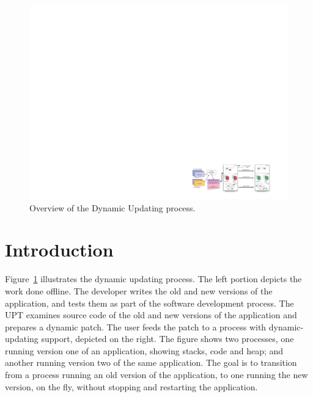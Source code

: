 \begin{figure}[t]
\centering\includegraphics[scale=0.38,clip=true,trim=2170 90 250 2125]{100-images/PASS-HPC-poster-8-2009-cropped}
\caption{Overview of the Dynamic Updating process.\label{fig:overview}}
\end{figure}

\section{Introduction}
\label{sec:system-intro}

Figure~\ref{fig:overview} illustrates the dynamic updating process. The left
portion depicts the work done offline. The developer writes the old and new
versions of the application, and tests them as part of the software
development process. The \acf{UPT} examines source code
of the old and new versions of the application and prepares a dynamic patch.
The user feeds the patch to a process with dynamic-updating support,
depicted on the right. The figure shows two processes, one
running version one of an application, showing stacks, code and heap; and
another running version two of the same application. The goal is to
transition from a process running an old version of the application, to one
running the new version, on the fly, without stopping and restarting the
application.

